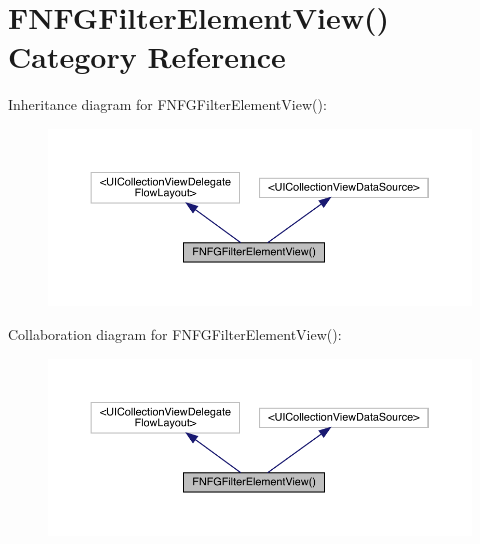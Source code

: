 \hypertarget{category_f_n_f_g_filter_element_view_07_08}{}\section{F\+N\+F\+G\+Filter\+Element\+View() Category Reference}
\label{category_f_n_f_g_filter_element_view_07_08}


Inheritance diagram for F\+N\+F\+G\+Filter\+Element\+View()\+:\nopagebreak
\begin{figure}[H]
\begin{center}
\leavevmode
\includegraphics[width=350pt]{category_f_n_f_g_filter_element_view_07_08__inherit__graph}
\end{center}
\end{figure}


Collaboration diagram for F\+N\+F\+G\+Filter\+Element\+View()\+:\nopagebreak
\begin{figure}[H]
\begin{center}
\leavevmode
\includegraphics[width=350pt]{category_f_n_f_g_filter_element_view_07_08__coll__graph}
\end{center}
\end{figure}
